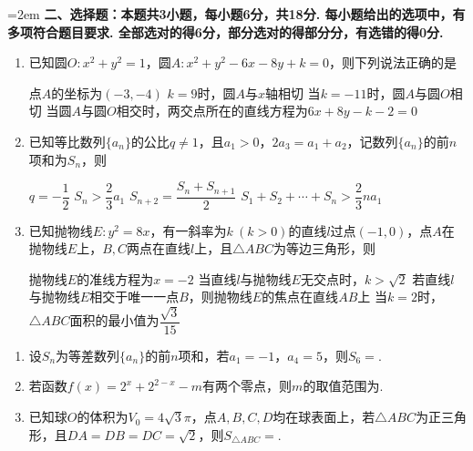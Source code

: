 \documentclass[12pt,a4paper]{article}
\begin{document}
	\vspace{0.3cm}
	\noindent\hangindent=2em {\bfseries 二、选择题：本题共3小题，每小题6分，共18分. 每小题给出的选项中，有多项符合题目要求. 全部选对的得6分，部分选对的得部分分，有选错的得0分.}
	\begin{enumerate}[leftmargin=*,label=\arabic*.,resume,itemsep=0.8ex]
		\item 已知圆$O:x^2+y^2=1$，圆$A:x^2+y^2-6x-8y+k=0$，则下列说法正确的是
		\begin{choicesOne}
			\choice 点$A$的坐标为$(-3,-4)$
			\choice $k=9$时，圆$A$与$x$轴相切
			\choice 当$k=-11$时，圆$A$与圆$O$相切
			\choice 当圆$A$与圆$O$相交时，两交点所在的直线方程为$6x+8y-k-2=0$
		\end{choicesOne}
		\item 已知等比数列$\{a_n\}$的公比$q\ne1$，且$a_1>0$，$2a_3=a_1+a_2$，记数列$\{a_n\}$的前$n$项和为$S_n$，则
		\begin{choicesOne}
			\choice $q=-\dfrac12$
			\choice $S_n>\dfrac23 a_1$
			\choice $S_{n+2}=\dfrac{S_n+S_{n+1}}{2}$
			\choice $S_1+S_2+\cdots+S_n>\dfrac23 na_1$
		\end{choicesOne}
		\item 已知抛物线$E:y^2=8x$，有一斜率为$k\ (k>0)$的直线$l$过点$(-1,0)$，点$A$在抛物线$E$上，$B,C$两点在直线$l$上，且$\triangle ABC$为等边三角形，则
		\begin{choicesOne}
			\choice 抛物线$E$的准线方程为$x=-2$
			\choice 当直线$l$与抛物线$E$无交点时，$k>\sqrt2$
			\choice 若直线$l$与抛物线$E$相交于唯一一点$B$，则抛物线$E$的焦点在直线$AB$上
			\choice 当$k=2$时，$\triangle ABC$面积的最小值为$\dfrac{\sqrt3}{15}$
		\end{choicesOne}
	\end{enumerate}
	\vspace{0.3cm}
	\begin{enumerate}[leftmargin=*,label=\arabic*.,resume,itemsep=0.8ex]
		\item 设$S_n$为等差数列$\{a_n\}$的前$n$项和，若$a_1=-1$，$a_4=5$，则$S_6=$\underline{\qquad\qquad}.
		\item 若函数$f(x)=2^x+2^{2-x}-m$有两个零点，则$m$的取值范围为\underline{\qquad\qquad}.
		\item 已知球$O$的体积为$V_0=4\sqrt3\pi$，点$A,B,C,D$均在球表面上，若$\triangle ABC$为正三角形，且$DA=DB=DC=\sqrt2$，则$S_{\triangle ABC}=$\underline{\qquad\qquad}.
	\end{enumerate}
	\vspace{0.3cm}
\end{document}
